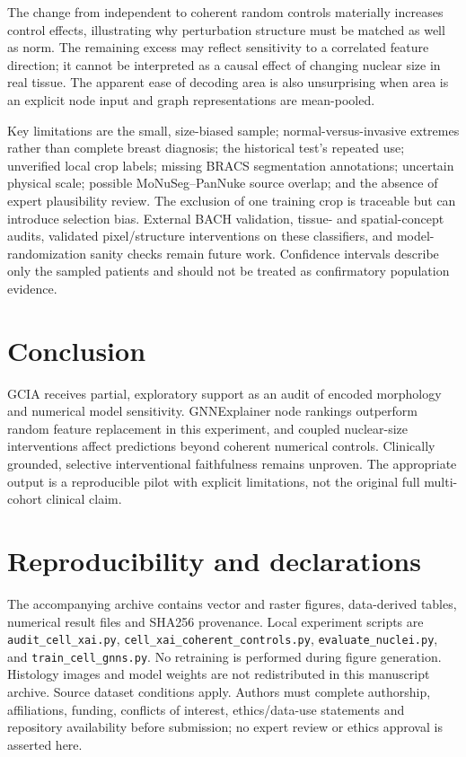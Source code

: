\documentclass[11pt,a4paper]{article}
\begin{document}
The change from independent to coherent random controls materially increases control effects, illustrating why perturbation structure must be matched as well as norm. The remaining excess may reflect sensitivity to a correlated feature direction; it cannot be interpreted as a causal effect of changing nuclear size in real tissue. The apparent ease of decoding area is also unsurprising when area is an explicit node input and graph representations are mean-pooled.

Key limitations are the small, size-biased sample; normal-versus-invasive extremes rather than complete breast diagnosis; the historical test's repeated use; unverified local crop labels; missing BRACS segmentation annotations; uncertain physical scale; possible MoNuSeg--PanNuke source overlap; and the absence of expert plausibility review. The exclusion of one training crop is traceable but can introduce selection bias. External BACH validation, tissue- and spatial-concept audits, validated pixel/structure interventions on these classifiers, and model-randomization sanity checks remain future work. Confidence intervals describe only the sampled patients and should not be treated as confirmatory population evidence.

\section{Conclusion}
GCIA receives partial, exploratory support as an audit of encoded morphology and numerical model sensitivity. GNNExplainer node rankings outperform random feature replacement in this experiment, and coupled nuclear-size interventions affect predictions beyond coherent numerical controls. Clinically grounded, selective interventional faithfulness remains unproven. The appropriate output is a reproducible pilot with explicit limitations, not the original full multi-cohort clinical claim.

\section*{Reproducibility and declarations}
The accompanying archive contains vector and raster figures, data-derived tables, numerical result files and SHA256 provenance. Local experiment scripts are \texttt{audit\_cell\_xai.py}, \texttt{cell\_xai\_coherent\_controls.py}, \texttt{evaluate\_nuclei.py}, and \texttt{train\_cell\_gnns.py}. No retraining is performed during figure generation. Histology images and model weights are not redistributed in this manuscript archive. Source dataset conditions apply. Authors must complete authorship, affiliations, funding, conflicts of interest, ethics/data-use statements and repository availability before submission; no expert review or ethics approval is asserted here.
\end{document}
